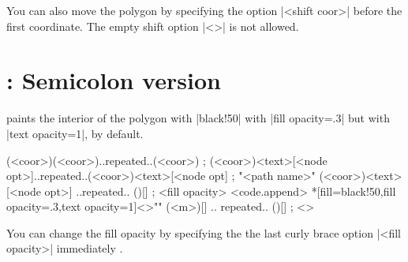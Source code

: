 \begin{tzcode}{.3}
{}
\end{tzcode}

You can also move the polygon by specifying the option |<shift coor>| before the first coordinate.
The empty shift option |<>| is not allowed.

\begin{tzcode}{.3}
\end{tzcode}


\section{\protect\cmd{\tzpolygon*}: Semicolon version}
\label{s:tzpolygon*}

\icmd{\tzpolygon*} paints the interior of the polygon with |black!50| with |fill opacity=.3| but with |text opacity=1|, by default.

\begin{tzdef}{}
\tzpolygon*(<coor>)(<coor>)..repeated..(<coor>) ;
\tzpolygon*(<coor>){<text>}[<node opt>]..repeated..(<coor>){<text>}[<node opt] ;
"<path name>" 
           (<coor>){<text>}[<node opt>]
           ..repeated.. (){}[] ; {<fill opacity>} <code.append>
 *[fill=black!50,fill opacity=.3,text opacity=1]<>""
  (<m>){}[] .. repeated.. (){}[] ; {} <>
\end{tzdef}

You can change the fill opacity by specifying the the last curly brace option |{<fill opacity>}| immediately .

\begin{tzcode}{.3}
\end{tzcode}


